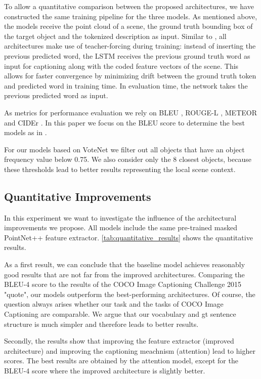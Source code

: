 \documentclass[10pt,twocolumn,letterpaper]{article}
\begin{document}
To allow a quantitative comparison between the proposed architectures, we have constructed the same training pipeline for the three models. As mentioned above, the models receive the point cloud of a scene, the ground truth bounding box of the target object and the tokenized description as input.
Similar to \cite{xu2015show}, all architectures make use of teacher-forcing during training: instead of inserting the previous predicted word, the LSTM receives the previous ground truth word as input for captioning along with the coded feature vectors of the scene.  This allows for faster convergence by minimizing drift between the ground truth token and predicted word in training time. In evaluation time, the network takes the previous predicted word as input. 

As metrics for performance evaluation we rely on BLEU \cite{Papineni2002BleuAM}, ROUGE-L \cite{Lin2004ROUGEAP}, METEOR \cite{Denkowski2014MeteorUL} and CIDEr \cite{DBLP:journals/corr/VedantamZP14a}.  In this paper we focus on the BLEU score to determine the best models as in \cite{xu2015show}. 

For our models based on VoteNet we filter out all objects that have an object frequency value below 0.75. We also consider only the 8 closest objects, because these thresholds lead to better results representing the local scene context.   

\subsection{Quantitative Improvements}
In this experiment we want to investigate the influence of the architectural improvements we propose. All models include the same pre-trained masked PointNet++ feature extractor. 
\autoref{tab:quantitative_results} shows the quantitative results. 

As a first result, we can conclude that the baseline model achieves reasonably good results that are not far from the improved architectures. Comparing the BLEU-4 score to the results of the COCO Image Captioning Challenge 2015 "quote", our models outperform the best-performing architectures. Of course, the question always arises whether our task and the tasks of COCO Image Captioning are comparable. We argue that our vocabulary and gt sentence structure is much simpler and therefore leads to better results.

Secondly, the results show that improving the feature extractor (improved architecture) and improving the captioning meachnism (attention) lead to higher scores. The best results are obtained by the attention model, except for the BLEU-4 score where the improved architecture is slightly better.                
\end{document}
